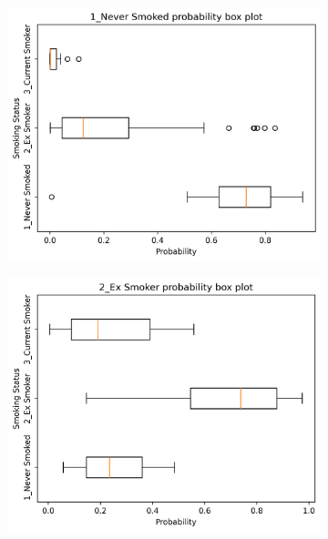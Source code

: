 \documentclass{article} %
\begin{document}
\begin{figure}[tb]
    \centering
    \begin{subfigure}{0.48\linewidth}
        \centering
        \includegraphics[width=\linewidth]{cohort1/test_boxplot_1.png}
    \end{subfigure}
    \hfill
    \begin{subfigure}{0.48\linewidth}
        \centering
        \includegraphics[width=\linewidth]{cohort1/test_boxplot_2.png}
    \end{subfigure}
    \begin{subfigure}{0.48\linewidth}

\end{subfigure}
\end{figure}
\end{document}
